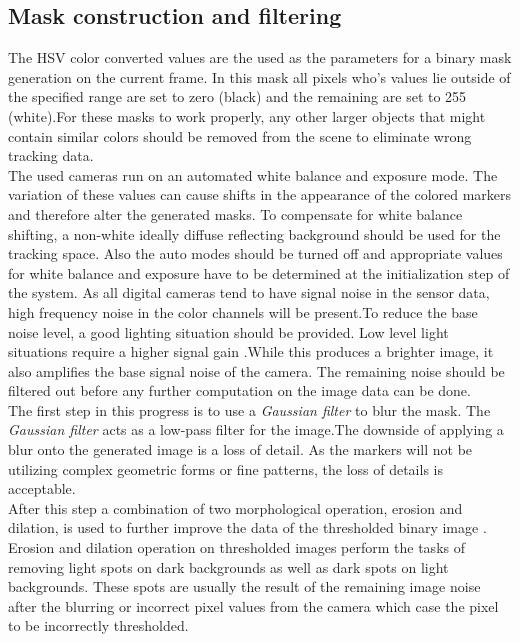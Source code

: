 \subsection{Mask construction and filtering}
The HSV color converted values are the used as the parameters for a binary mask generation on the current frame. In this mask all pixels who's values lie outside of the specified range are set to zero (black) and the remaining are set to 255 (white).For these masks to work properly, any other larger objects that might contain similar colors should be removed from the scene to eliminate wrong tracking data. \\The used cameras run on an automated white balance and exposure mode. The variation of these values can cause shifts in the appearance of the colored markers and therefore alter the generated masks. To compensate for white balance shifting, a non-white ideally diffuse reflecting background should be used for the tracking space. Also the auto modes should be turned off and appropriate values for white balance and exposure have to be determined at the initialization step of the system. As all digital cameras tend to have signal noise in the sensor data, high frequency noise in the color channels will be present.To reduce the base noise level, a good lighting situation should be provided. Low level light situations require a higher signal gain .While this produces a brighter image, it also amplifies the base signal noise of the camera. The remaining noise should be filtered out before any further computation on the image data can be done.\\
The first step in this progress is to use a \textit{Gaussian filter} to blur the mask.
The \textit{Gaussian filter} acts as a low-pass filter for the image.The downside of applying a blur onto the generated image is a loss of detail. As the markers will not be utilizing complex geometric forms or fine patterns, the loss of details is acceptable.\\
After this step a combination of two morphological operation, erosion and dilation, is used to further improve the data of the thresholded binary image \cite[chapter~3.11-12]{Davies.2017}.
Erosion and dilation operation on thresholded images perform the tasks of removing light spots on dark backgrounds as well as dark spots on light backgrounds. These spots are usually the result of the remaining image noise after the blurring or incorrect pixel values from the camera which case the pixel to be incorrectly thresholded.\\
